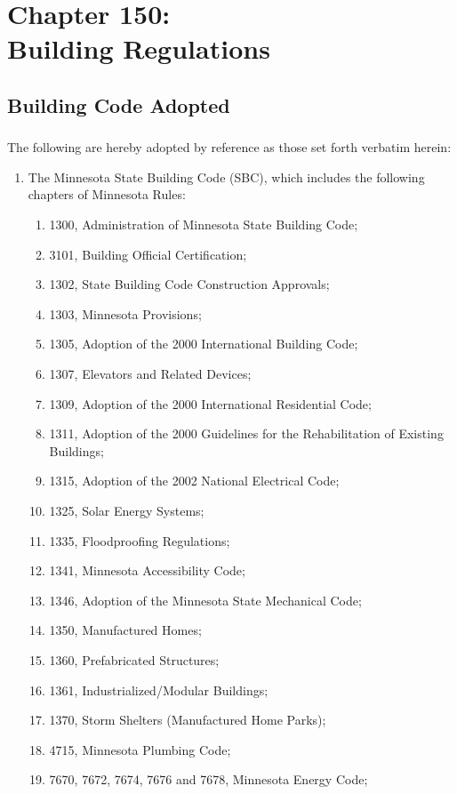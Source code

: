 \chapter*{Chapter 150: \\
	Building Regulations}
    \minitoc
    \pagebreak

\section{Building Code Adopted}
\subsection{}
The following are hereby adopted by reference as those set forth verbatim herein:
\begin{enumerate}[{\indent}1)]
    \item The Minnesota State Building Code (SBC), which includes the following chapters of Minnesota Rules:
    \begin{enumerate}
        \item 1300, Administration of Minnesota State Building Code;
        \item 3101, Building Official Certification;
        \item 1302, State Building Code Construction Approvals;
        \item 1303, Minnesota Provisions;
        \item 1305, Adoption of the 2000 International Building Code;
        \item 1307, Elevators and Related Devices;
        \item 1309, Adoption of the 2000 International Residential Code;
        \item 1311, Adoption of the 2000 Guidelines for the Rehabilitation of Existing Buildings;
        \item 1315, Adoption of the 2002 National Electrical Code;
        \item 1325, Solar Energy Systems;
        \item 1335, Floodproofing Regulations;
        \item 1341, Minnesota Accessibility Code;
        \item 1346, Adoption of the Minnesota State Mechanical Code;
        \item 1350, Manufactured Homes;
        \item 1360, Prefabricated Structures;
        \item 1361, Industrialized/Modular Buildings;
        \item 1370, Storm Shelters (Manufactured Home Parks);
        \item 4715, Minnesota Plumbing Code;
        \item 7670, 7672, 7674, 7676 and 7678, Minnesota Energy Code;
    \end{enumerate}
\end{enumerate}
